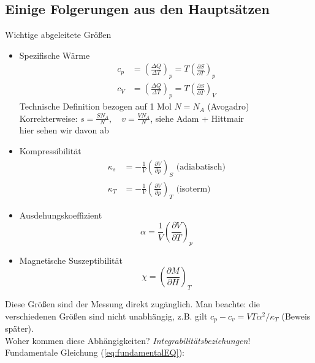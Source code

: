 \subsection{Einige Folgerungen aus den Hauptsätzen}
Wichtige abgeleitete Größen
\begin{itemize}
  \item Spezifische Wärme
    \begin{equation}
  	\begin{split}
  	  c_p &= \left( \frac{\Delta Q}{\Delta T} \right)_p = T \left( \frac{\partial S}{\partial T} \right)_p \\
  	  c_V &= \left( \frac{\Delta Q}{\Delta T} \right)_p = T \left( \frac{\partial S}{\partial T} \right)_V
  	\end{split}
    \end{equation}
    Technische Definition bezogen auf 1 Mol $N=N_A$ (Avogadro) \\
    Korrekterweise: $s = \frac{S N_A}{N}, \quad v = \frac{V N_A}{N}$, siehe Adam + Hittmair \\
    hier sehen wir davon ab
  \item Kompressibilität
    \begin{equation}
   	\begin{split}
  	  \kappa_s &= - \frac{1}{V} \left( \frac{\partial V}{\partial p} \right)_S \text{ (adiabatisch)} \\
  	  \kappa_T &= - \frac{1}{V} \left( \frac{\partial V}{\partial p} \right)_T \text{ (isoterm)}
    \end{split}
	\end{equation}
  \item Ausdehungskoeffizient
  \begin{equation}
  	\alpha = \frac{1}{V} \left( \frac{\partial V}{\partial T} \right)_p
  \end{equation}
  \item Magnetische Suszeptibilität
  \begin{equation}
  	\chi = \left( \frac{\partial M}{\partial H} \right)_T
  \end{equation}
\end{itemize}
Diese Größen sind der Messung direkt zugänglich. Man beachte: die verschiedenen Größen sind nicht unabhängig, z.B. gilt 
$c_p - c_v = V T \alpha^2 / \kappa_T$ (Beweis später). \\
Woher kommen diese Abhängigkeiten? \emph{Integrabilitätsbeziehungen}! \\[\baselineskip]
Fundamentale Gleichung (\ref{eq:fundamentalEQ}):

